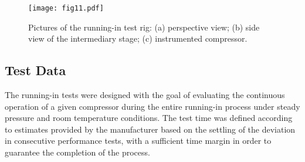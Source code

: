 \documentclass[preprint,11pt,number]{elsarticle}
\begin{document}
\begin{figure}[htb]
\begin{center}
\texttt{[image: fig11.pdf]}    %
\caption{Pictures of the running-in test rig: (a) perspective view; (b) side view of the intermediary stage; (c) instrumented compressor.} 
\label{fig:fotosBancada}
\end{center}
\end{figure}

\subsection{Test Data}\label{subsec:TestData}

The running-in tests were designed with the goal of evaluating the continuous operation of a given compressor during the entire running-in process under steady pressure and room temperature conditions. The test time was defined according to estimates provided by the manufacturer based on the settling of the deviation in consecutive performance tests, with a sufficient time margin in order to guarantee the completion of the process.
\end{document}
